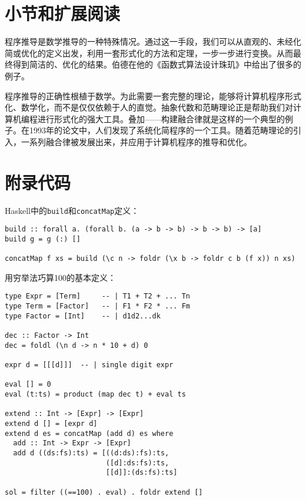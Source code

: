 \documentclass{article}
\begin{document}
\begin{Exercise}
\end{Exercise}

\section{小节和扩展阅读}

程序推导是数学推导的一种特殊情况。通过这一手段，我们可以从直观的、未经化简或优化的定义出发，利用一套形式化的方法和定理，一步一步进行变换。从而最终得到简洁的、优化的结果。伯德在他的《函数式算法设计珠玑》\cite{Bird-2010}中给出了很多的例子。

程序推导的正确性根植于数学。为此需要一套完整的理论，能够将计算机程序形式化、数学化，而不是仅仅依赖于人的直觉。抽象代数和范畴理论正是帮助我们对计算机编程进行形式化的强大工具。叠加——构建融合律就是这样的一个典型的例子。在1993年的论文\cite{GLPJ-1993}中，人们发现了系统化简程序的一个工具。随着范畴理论的引入，一系列融合律被发展出来\cite{Hinze-Harper-James-2010}，并应用于计算机程序的推导和优化。

\section{附录代码}

Haskell中的\texttt{build}和\texttt{concatMap}定义：

\lstset{frame=single}
\begin{lstlisting}
build :: forall a. (forall b. (a -> b -> b) -> b -> b) -> [a]
build g = g (:) []

concatMap f xs = build (\c n -> foldr (\x b -> foldr c b (f x)) n xs)
\end{lstlisting}

用穷举法巧算100的基本定义：
\begin{lstlisting}
type Expr = [Term]     -- | T1 + T2 + ... Tn
type Term = [Factor]   -- | F1 * F2 * ... Fm
type Factor = [Int]    -- | d1d2...dk

dec :: Factor -> Int
dec = foldl (\n d -> n * 10 + d) 0

expr d = [[[d]]]  -- | single digit expr

eval [] = 0
eval (t:ts) = product (map dec t) + eval ts

extend :: Int -> [Expr] -> [Expr]
extend d [] = [expr d]
extend d es = concatMap (add d) es where
  add :: Int -> Expr -> [Expr]
  add d ((ds:fs):ts) = [((d:ds):fs):ts,
                        ([d]:ds:fs):ts,
                        [[d]]:(ds:fs):ts]

sol = filter ((==100) . eval) . foldr extend []
\end{lstlisting}
\end{document}
